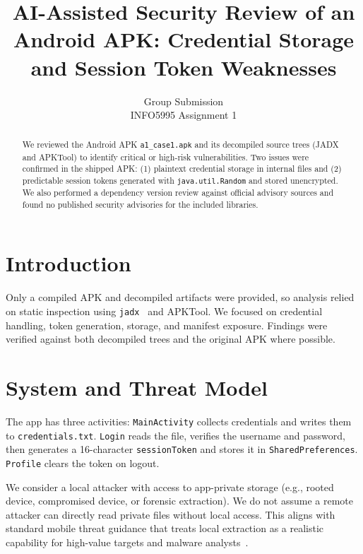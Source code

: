 \documentclass[letterpaper,twocolumn,10pt]{article}
\begin{document}
\date{}
\title{\Large \bf AI-Assisted Security Review of an Android APK: Credential Storage and Session Token Weaknesses}
\author{{\rm Group Submission}\\INFO5995 Assignment 1}
\maketitle

\begin{abstract}
We reviewed the Android APK \texttt{a1\_case1.apk} and its decompiled source trees (JADX and APKTool) to identify critical or high-risk vulnerabilities. Two issues were confirmed in the shipped APK: (1) plaintext credential storage in internal files and (2) predictable session tokens generated with \texttt{java.util.Random} and stored unencrypted. We also performed a dependency version review against official advisory sources and found no published security advisories for the included libraries.
\end{abstract}

\section{Introduction}
Only a compiled APK and decompiled artifacts were provided, so analysis relied on static inspection using \texttt{jadx}~\cite{jadx} and APKTool. We focused on credential handling, token generation, storage, and manifest exposure. Findings were verified against both decompiled trees and the original APK where possible.

\section{System and Threat Model}
The app has three activities: \texttt{MainActivity} collects credentials and writes them to \texttt{credentials.txt}. \texttt{Login} reads the file, verifies the username and password, then generates a 16-character \texttt{sessionToken} and stores it in \texttt{SharedPreferences}. \texttt{Profile} clears the token on logout.

We consider a local attacker with access to app-private storage (e.g., rooted device, compromised device, or forensic extraction). We do not assume a remote attacker can directly read private files without local access. This aligns with standard mobile threat guidance that treats local extraction as a realistic capability for high-value targets and malware analysts~\cite{masvs}.
\end{document}
